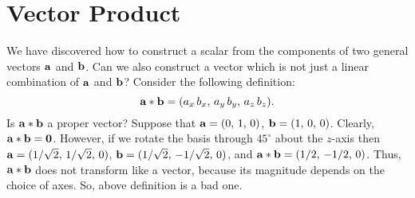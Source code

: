 \section{Vector Product}
We have discovered how to construct a scalar from the components of two
general vectors $\bf a$ and $\bf b$. Can we also construct a vector which is not
just a linear combination of $\bf a$ and $\bf b$? Consider the following definition:
\begin{equation}
{\bf a} \ast{\bf b} = (a_x \,b_x,\, a_y\, b_y,\, a_z \,b_z).
\end{equation}
Is ${\bf a} \ast {\bf b}$ a proper vector? Suppose  that ${\bf a} =
(0,\,1,\,0)$, ${\bf b} = (1,\,0,\,0)$. Clearly,  ${\bf a} \ast {\bf b}= {\bf 0}$.
However, if we rotate the basis through $45^\circ$ about the $z$-axis then
${\bf a} = (1/\sqrt{2},\, 1/\sqrt{2},\, 0)$, ${\bf b} = (1/\sqrt{2},\, -1/\sqrt{2},\,0)$,
and ${\bf a}\ast {\bf b} = (1/2,\, -1/2,\,0)$. Thus, ${\bf a}\ast {\bf b}$ does
not transform like a vector, because its magnitude depends on the choice of axes.
So, above definition is a bad one.

